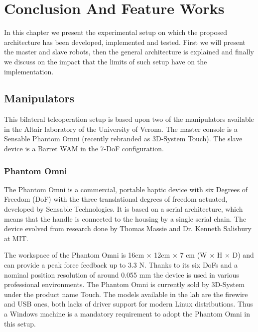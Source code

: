 \chapter{Conclusion And Feature Works}
In this chapter we present the experimental setup on which the proposed architecture has been developed, implemented and tested.
First we will present the master and slave robots,  then the general architecture is explained and finally we discuss on the impact that the limits of such setup have on the implementation.

\section{Manipulators}
This bilateral teleoperation setup is based upon two of the manipulators available in the Altair laboratory of the University of Verona.
The master console is a Sensable Phantom Omni (recently rebranded as 3D-System Touch).
The slave device is a Barret WAM in the 7-DoF configuration.

\subsection{Phantom Omni}
The Phantom Omni is a commercial, portable haptic device with six Degrees of Freedom (DoF) with the three translational degrees of freedom actuated, developed by Sensable Technologies. It is based on a serial architecture, which means that the handle is connected to the housing by a single serial chain.
The device evolved from research done by Thomas Massie and Dr. Kenneth Salisbury at MIT.

The workspace of the Phantom Omni is 16cm $\times$ 12cm $\times$ 7 cm (W $\times$ H $\times$ D) and can provide a peak force feedback up to 3.3 N. Thanks to its six DoFs and a nominal position resolution of around 0.055 mm the device is used in various professional environments. The Phantom Omni is currently sold by 3D-System under the product name Touch.
The models available in the lab are the firewire  and USB ones, both lacks of driver support for modern Linux distributions. Thus a Windows machine is a mandatory requirement to adopt the Phantom Omni in this setup.


